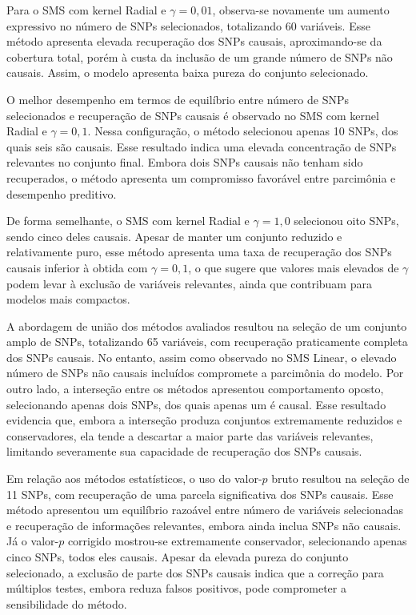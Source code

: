 \documentclass[
    12pt,
    a4paper,
    oneside,
    english,
    french,
    spanish,
    brazil
    ]{abntex2}
\begin{document}
Para o SMS com kernel Radial e $\gamma = 0{,}01$, observa-se novamente um aumento expressivo no número de SNPs selecionados, totalizando 60 variáveis. Esse método apresenta elevada recuperação dos SNPs causais, aproximando-se da cobertura total, porém à custa da inclusão de um grande número de SNPs não causais. Assim, o modelo apresenta baixa pureza do conjunto selecionado.

O melhor desempenho em termos de equilíbrio entre número de SNPs selecionados e recuperação de SNPs causais é observado no SMS com kernel Radial e $\gamma = 0{,}1$. Nessa configuração, o método selecionou apenas 10 SNPs, dos quais seis são causais. Esse resultado indica uma elevada concentração de SNPs relevantes no conjunto final. Embora dois SNPs causais não tenham sido recuperados, o método apresenta um compromisso favorável entre parcimônia e desempenho preditivo.

De forma semelhante, o SMS com kernel Radial e $\gamma = 1{,}0$ selecionou oito SNPs, sendo cinco deles causais. Apesar de manter um conjunto reduzido e relativamente puro, esse método apresenta uma taxa de recuperação dos SNPs causais inferior à obtida com $\gamma = 0{,}1$, o que sugere que valores mais elevados de $\gamma$ podem levar à exclusão de variáveis relevantes, ainda que contribuam para modelos mais compactos.

A abordagem de união dos métodos avaliados resultou na seleção de um conjunto amplo de SNPs, totalizando 65 variáveis, com recuperação praticamente completa dos SNPs causais. No entanto, assim como observado no SMS Linear, o elevado número de SNPs não causais incluídos compromete a parcimônia do modelo. Por outro lado, a interseção entre os métodos apresentou comportamento oposto, selecionando apenas dois SNPs, dos quais apenas um é causal. Esse resultado evidencia que, embora a interseção produza conjuntos extremamente reduzidos e conservadores, ela tende a descartar a maior parte das variáveis relevantes, limitando severamente sua capacidade de recuperação dos SNPs causais.

Em relação aos métodos estatísticos, o uso do valor-$p$ bruto resultou na seleção de 11 SNPs, com recuperação de uma parcela significativa dos SNPs causais. Esse método apresentou um equilíbrio razoável entre número de variáveis selecionadas e recuperação de informações relevantes, embora ainda inclua SNPs não causais. Já o valor-$p$ corrigido mostrou-se extremamente conservador, selecionando apenas cinco SNPs, todos eles causais. Apesar da elevada pureza do conjunto selecionado, a exclusão de parte dos SNPs causais indica que a correção para múltiplos testes, embora reduza falsos positivos, pode comprometer a sensibilidade do método.
\end{document}
